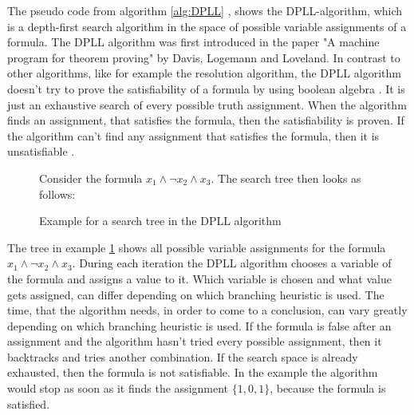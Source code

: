 The pseudo code from algorithm \ref{alg:DPLL} \cite{biere2009handbook}, shows the DPLL-algorithm, which is a depth-first search algorithm in the space of possible variable assignments of a formula. The DPLL algorithm was first introduced in the paper "A machine program for theorem proving" \cite{davis1962machine} by Davis, Logemann and Loveland. In contrast to other algorithms, like for example the resolution algorithm, the DPLL algorithm doesn't try to prove the satisfiability of a formula by using boolean algebra \cite{biere2009handbook}. It is just an exhaustive search of every possible truth assignment. When the algorithm finds an assignment, that satisfies the formula, then the satisfiability is proven. If the algorithm can't find any assignment that satisfies the formula, then it is unsatisfiable \cite{biere2009handbook}.

\begin{figure}[!htb]
\begin{leftbar}
Consider the formula $x_1 \wedge \neg x_2 \wedge x_3$. The search tree then looks as follows:\\
\centering
{}
\end{leftbar}
\caption{Example for a search tree in the DPLL algorithm}
\label{ex:SearchTree}
\end{figure}

The tree in example \ref{ex:SearchTree} shows all possible variable assignments for the formula $x_1 \wedge \neg x_2 \wedge x_3$. During each iteration the DPLL algorithm chooses a variable of the formula and assigns a value to it. Which variable is chosen and what value gets assigned, can differ depending on which branching heuristic is used. The time, that the algorithm needs, in order to come to a conclusion, can vary greatly depending on which branching heuristic is used. If the formula is false after an assignment and the algorithm hasn't tried every possible assignment, then it backtracks and tries another combination. If the search space is already exhausted, then the formula is not satisfiable. In the example the algorithm would stop as soon as it finds the assignment $\{1,0,1\}$, because the formula is satisfied.

